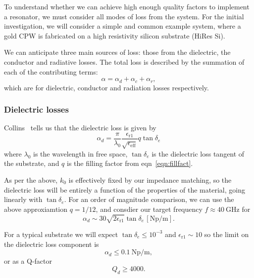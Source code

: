 To understand whether we can achieve high enough quality factors to implement a
resonator, we must consider all modes of loss from the system. For the initial
investigation, we will consider a simple and common example system, where a gold
CPW is fabricated on a high resistivity silicon substrate (HiRes Si). 

We can anticipate three main sources of loss: those from the dielectric, the
conductor and radiative losses. \cite{Simons2004} The total loss is described
by the summation of each of the contributing terms:
\begin{equation}
  \alpha = \alpha_d + \alpha_c + \alpha_r,
\end{equation}
which are for dielectric, conductor and radiation losses respectively.

\subsubsection*{Dielectric losses}

Collins~\cite{Collin2007} tells us that the dielectric loss is given by
\begin{equation}
  \alpha_d =
  \frac{\pi}{\lambda_0}\frac{\epsilon_\mathrm{r1}}{\sqrt{\epsilon_\mathrm{eff}}}
  q \tan \delta_e
\end{equation}
where $\lambda_0$ is the wavelength in free space, $\tan \delta_e$ is the
dielectric loss tangent of the substrate, and $q$ is the filling factor from
eqn~\ref{eqn:fillfact}.

As per the above, $k_0$ is effectively fixed by our impedance matching, so the
dielectric loss will be entirely a function of the properties of the material,
going linearly with $\tan\delta_e$. For an order of magnitude comparison, we can
use the above approxiamtion $q=1/12$, and consdier our target frequency
$f\approx\SI{40}{\giga\hertz}$ for
\begin{equation}
  \alpha_d \sim 30\sqrt{2\epsilon_\mathrm{r1}}\tan\delta_e
  \,[\si{\neper\per\meter}].
\end{equation}

For a typical substrate we will expect $\tan\delta_e\leq10^{-3}$ and
$\epsilon_\mathrm{r1} \sim 10$ so the limit on the dielectric loss component is
\begin{equation}
  \alpha_d \leq \SI{0.1}{\neper\per\meter},
\end{equation}
or as a Q-factor
\begin{equation}
  Q_d \geq 4000.
\end{equation}

